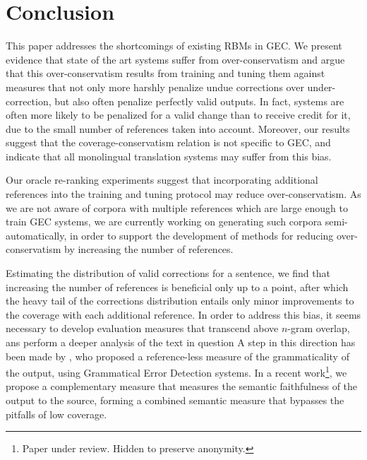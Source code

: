 \documentclass[letterpaper, 11pt]{article}
\begin{document}
\section{Conclusion}

This paper addresses the shortcomings of existing RBMs in GEC.
We present evidence that state of the art systems suffer from over-conservatism and
argue that this over-conservatism results from training and tuning them against measures that
not only more harshly penalize undue corrections over under-correction,
but also often penalize perfectly valid outputs.
In fact, systems are often more likely to be penalized for a valid change than 
to receive credit for it, due to the small number of references taken into account.
Moreover, our results suggest that the coverage-conservatism relation is not specific to
GEC, and indicate that all monolingual translation systems may suffer from this bias.

Our oracle re-ranking experiments suggest that incorporating additional references into the training and tuning
protocol may reduce over-conservatism. 
As we are not aware of corpora with multiple references which are large enough to train GEC systems,
we are currently working on generating such corpora semi-automatically, in order to support the development of
methods for reducing over-conservatism by increasing the number of references.

Estimating the distribution of valid corrections for a sentence, we find
that increasing the number of references is beneficial only up to a point, after which
the heavy tail of the corrections distribution entails only minor improvements to 
the coverage with each additional reference.
In order to address this bias, it seems necessary to develop evaluation measures that
transcend above $n$-gram overlap, ans perform a deeper analysis of the text in question
A step in this direction has been made by , who proposed
a reference-less measure of the grammaticality of the output, using Grammatical Error Detection systems.
In a recent work\footnote{Paper under review. Hidden to preserve anonymity.}, we propose a complementary
measure that measures the semantic faithfulness of the output to the source, forming a combined
semantic measure that bypasses the pitfalls of low coverage.
\end{document}
